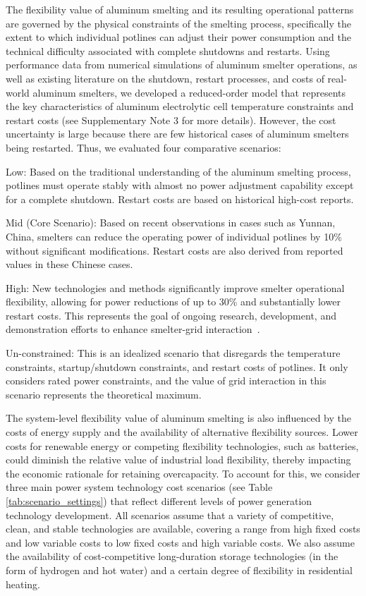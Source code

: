 \documentclass[preprint]{elsarticle}
\begin{document}
The flexibility value of aluminum smelting and its resulting operational patterns are governed by the physical constraints of the smelting process, specifically the extent to which individual potlines can adjust their power consumption and the technical difficulty associated with complete shutdowns and restarts. Using performance data from numerical simulations of aluminum smelter operations, as well as existing literature on the shutdown, restart processes, and costs of real-world aluminum smelters, we developed a reduced-order model that represents the key characteristics of aluminum electrolytic cell temperature constraints and restart costs (see Supplementary Note 3 for more details). However, the cost uncertainty is large because there are few historical cases of aluminum smelters being restarted. Thus, we evaluated four comparative scenarios: 

Low: Based on the traditional understanding of the aluminum smelting process, potlines must operate stably with almost no power adjustment capability except for a complete shutdown. Restart costs are based on historical high-cost reports.

Mid (Core Scenario): Based on recent observations in cases such as Yunnan, China, smelters can reduce the operating power of individual potlines by 10\% without significant modifications. Restart costs are also derived from reported values in these Chinese cases.

High: New technologies and methods significantly improve smelter operational flexibility, allowing for power reductions of up to 30\% and substantially lower restart costs. This represents the goal of ongoing research, development, and demonstration efforts to enhance smelter-grid interaction~\citep{lukin_reduction_2016}.

Un-constrained: This is an idealized scenario that disregards the temperature constraints, startup/shutdown constraints, and restart costs of potlines. It only considers rated power constraints, and the value of grid interaction in this scenario represents the theoretical maximum.


The system-level flexibility value of aluminum smelting is also influenced by the costs of energy supply and the availability of alternative flexibility sources. Lower costs for renewable energy or competing flexibility technologies, such as batteries, could diminish the relative value of industrial load flexibility, thereby impacting the economic rationale for retaining overcapacity. To account for this, we consider three main power system technology cost scenarios (see Table \ref{tab:scenario_settings}) that reflect different levels of power generation technology development. All scenarios assume that a variety of competitive, clean, and stable technologies are available, covering a range from high fixed costs and low variable costs to low fixed costs and high variable costs. We also assume the availability of cost-competitive long-duration storage technologies (in the form of hydrogen and hot water) and a certain degree of flexibility in residential heating.
\end{document}
